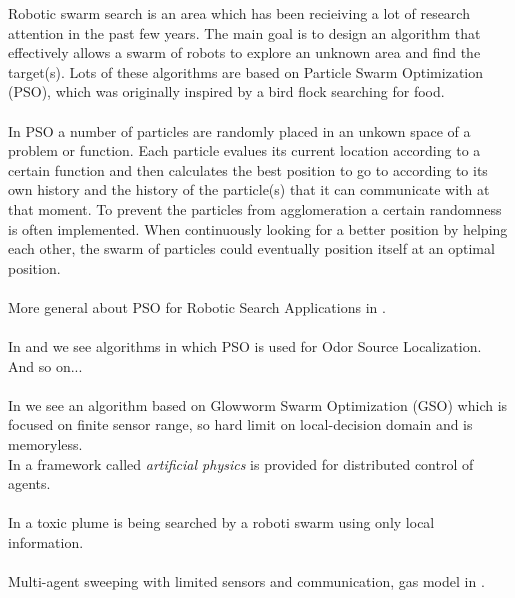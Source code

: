
Robotic swarm search is an area which has been recieiving a lot of research attention in the past few years. The main goal is to design an algorithm that effectively allows a swarm of robots to explore an unknown area and find the target(s). Lots of these algorithms are based on Particle Swarm Optimization (PSO), which was originally inspired by a bird flock searching for food. \cite{kennedy1995particle}\\
\\
In PSO a number of particles are randomly placed in an unkown space of a problem or function. Each particle evalues its current location according to a certain function and then calculates the best position to go to according to its own history and the history of the particle(s) that it can communicate with at that moment. To prevent the particles from agglomeration a certain randomness is often implemented. When continuously looking for a better position by helping each other, the swarm of particles could eventually position itself at an optimal position. \cite{poli2007particle} \\
\\
More general about PSO for Robotic Search Applications in \cite{doctor2004optimal}.\\
\\
In \cite{jatmiko2007pso} and \cite{marques2006particle} we see algorithms in which PSO is used for Odor Source Localization. And so on... \\
\\
In \cite{krishnanand2006glowworm} we see an algorithm based on Glowworm Swarm Optimization (GSO) which is focused on finite sensor range, so hard limit on local-decision domain and is memoryless.
\\
In \cite{zarzhitsky2005agent} a framework called \emph{artificial physics} is provided for distributed control of agents.\\
\\
In \cite{zarzhitsky2005distributed} a toxic plume is being searched by a roboti swarm using only local information. \\
\\
Multi-agent sweeping with limited sensors and communication, gas model in \cite{kerr2005two}.